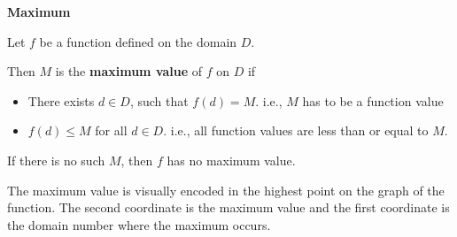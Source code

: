 \documentclass{ximera}
\begin{document}
\begin{definition} \textbf{\textcolor{green!50!black}{Maximum}} 


Let $f$ be a function defined on the domain $D$.

Then $M$ is the \textbf{maximum value} of $f$ on $D$ if    


\begin{itemize}
\item There exists $d \in D$, such that $f(d) = M$.   i.e., $M$ has to be a function value \\

\item $f(d) \leq M$ for all $d \in D$. i.e., all function values are less than or equal to $M$. 

\end{itemize}


If there is no such $M$, then $f$ has no maximum value.

\end{definition}



\begin{observation}
The maximum value is visually encoded in the highest point on the graph of the function.  The second coordinate is the maximum value and the first coordinate is the domain number where the maximum occurs.
\end{observation}
\end{document}
